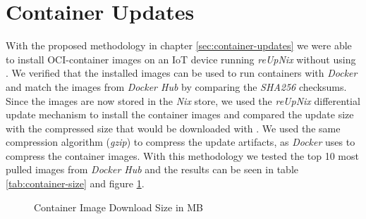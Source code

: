 \clearpage
\section{Container Updates}
With the proposed methodology in chapter \ref{sec:container-updates} we were able
to install \ac{OCI}-container images
on an \ac{IoT} device running \textit{reUpNix} without using .
We verified that the installed images can be used to run containers with \textit{Docker}
and match the images from \textit{Docker Hub} by comparing the \textit{SHA256} checksums.
Since the images are now stored in the \textit{Nix} store, we used the \textit{reUpNix}
differential update mechanism to install the container images and compared the update size
with the compressed size that would be downloaded with . We used
the same compression algorithm (\textit{gzip}) to compress the update artifacts,
as \textit{Docker} uses to compress the container images. With this methodology
we tested the top 10 most pulled images from \textit{Docker Hub} and the results
can be seen in table \ref{tab:container-size} and figure \ref{fig:container-size}.

\begin{figure}[htbp]
  \centering
  \caption{Container Image Download Size in MB}
  \label{fig:container-size}
\end{figure}

